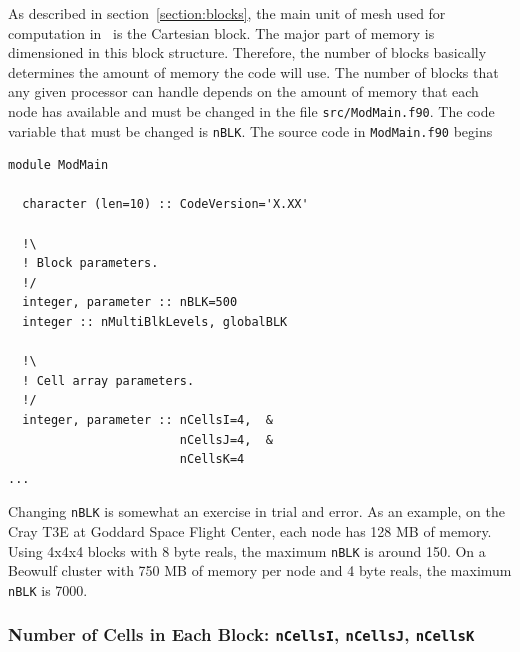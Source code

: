 As described in section~\ref{section:blocks}, 
the main unit of mesh used for computation in \BATSRUS\ 
is the Cartesian block.  The major part of memory is dimensioned in this
block structure.  Therefore, the number of blocks basically determines the
amount of memory the code will use.  The number
of blocks that any given processor can handle depends on the amount of
memory that each node has available and must be changed in the file {\tt src/ModMain.f90}.
The code variable that must be changed is {\tt nBLK}.  The source code in    
{\tt ModMain.f90} begins
\begin{verbatim}
module ModMain

  character (len=10) :: CodeVersion='X.XX'

  !\
  ! Block parameters.
  !/
  integer, parameter :: nBLK=500
  integer :: nMultiBlkLevels, globalBLK

  !\
  ! Cell array parameters.
  !/
  integer, parameter :: nCellsI=4,  &
                        nCellsJ=4,  &
                        nCellsK=4
...
\end{verbatim}
Changing  {\tt nBLK} is somewhat an exercise in trial and error.  As an example,
on the Cray T3E at Goddard Space Flight Center, each node has 128 MB of memory.
Using 4x4x4 blocks with 8 byte reals, the maximum {\tt nBLK} is around 150.  
On a Beowulf cluster 
with 750 MB of memory per node and 4 byte reals, the maximum {\tt nBLK} is 7000.

\subsubsection{Number of Cells in Each Block: {\tt nCellsI},
{\tt nCellsJ}, {\tt nCellsK} \label{section:ncells}}

